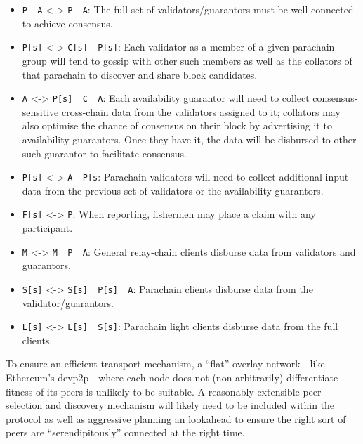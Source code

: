 \documentclass[9pt,oneside]{amsart}
\begin{document}
\begin{multicols}{2}
\begin{itemize}
\item \texttt{P\ \textbar{}\ A} \textless{}-\textgreater{} \texttt{P\ \textbar{}\ A}: The full set of validators/guarantors must be well-connected to achieve consensus.
\item \texttt{P{[}s{]}} \textless{}-\textgreater{} \texttt{C{[}s{]}\ \textbar{}\ P{[}s{]}}: Each validator as a member of a given parachain group will tend to gossip with other such members as well as the collators of that parachain to discover and share block candidates.
\item \texttt{A} \textless{}-\textgreater{} \texttt{P{[}s{]}\ \textbar{}\ C\ \textbar{}\ A}: Each availability guarantor will need to collect consensus-sensitive cross-chain data from the validators assigned to it; collators may also optimise the chance of consensus on their block by advertising it to availability guarantors. Once they have it, the data will be disbursed to other such guarantor to facilitate consensus.
\item \texttt{P{[}s{]}} \textless{}-\textgreater{} \texttt{A\ \textbar{}\ P{[}s\textquotesingle{}{]}}: Parachain validators will need to collect additional input data from the previous set of validators or the availability guarantors.
\item \texttt{F{[}s{]}} \textless{}-\textgreater{} \texttt{P}: When reporting, fishermen may place a claim with any participant.
\item \texttt{M} \textless{}-\textgreater{} \texttt{M\ \textbar{}\ P\ \textbar{}\ A}: General relay-chain clients disburse data from validators and guarantors.
\item \texttt{S{[}s{]}} \textless{}-\textgreater{} \texttt{S{[}s{]}\ \textbar{}\ P{[}s{]}\ \textbar{}\ A}: Parachain clients disburse data from the validator/guarantors.
\item \texttt{L{[}s{]}} \textless{}-\textgreater{} \texttt{L{[}s{]}\ \textbar{}\ S{[}s{]}}: Parachain light clients disburse data from the full clients.
\end{itemize}

 To ensure an efficient transport mechanism, a ``flat'' overlay network---like Ethereum's devp2p---where each node does not (non-arbitrarily) differentiate fitness of its peers is unlikely to be suitable. A reasonably extensible peer selection and discovery mechanism will likely need to be included within the protocol as well as aggressive planning an lookahead to ensure the right sort of peers are ``serendipitously'' connected at the right time.


\end{multicols}
\end{document}
